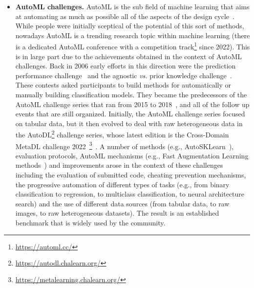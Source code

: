 \documentclass[twoside,11pt]{article}
\begin{document}
\begin{itemize}
    \item \textbf{AutoML challenges.} %
    AutoML is the sub field of machine learning that  aims at automating as much as possible all of the aspects of the design cycle~\citep{automlbook}. While people were initially sceptical of the potential of this sort of methods, nowadays AutoML is a trending research topic within machine learning (there is a dedicated  AutoML conference with a competition track\footnote{\url{https://automl.cc/}} since 2022). This is in large part due to the achievements obtained in the context of AutoML challenges. Back in 2006 early efforts in this direction were the prediction performance challenge~\citep{DBLP:conf/ijcnn/GuyonADB06} and the agnostic {\em vs.} prior knowledge challenge~\citep{DBLP:journals/nn/GuyonSDC08}. These contests asked participants to build methods for automatically or manually building classification models. They became the predecessors of the AutoML challenge series that ran from 2015 to 2018~\citep{DBLP:books/sp/19/GuyonSBEELJRSSSTV19},
    and all of the follow up events that are still organized. Initially, the AutoML challenge series focused on tabular data, but it then evolved to deal with raw heterogeneous data in the AutoDL\footnote{ \url{https://autodl.chalearn.org/}} challenge series\citep{ChaLearnAutoDL2019}, whose  latest edition is the  Cross-Domain MetaDL challenge 2022~\footnote{\url{https://metalearning.chalearn.org/}}~\citep{elbaz2021metadl, elbaz:hal-03688638, https://doi.org/10.48550/arxiv.2208.14686}.%
    A number of methods (e.g., AutoSKLearn~\citep{Feurer2019}), evaluation protocols, AutoML mechanisms (e.g., Fast Augmentation Learning methods~\citep{baek2020autoclint}) and improvements arose in the context of these challenges including the evaluation of submitted  code, cheating prevention mechanisms, the progressive automation of different types of tasks (e.g., from binary classification to regression, to multiclass classification, to neural architecture search) and the use of different data sources  (from tabular data, to raw images, to raw heterogeneous datasets). The result is an established benchmark that is widely used by the community. 
    

\end{itemize}
\end{document}
